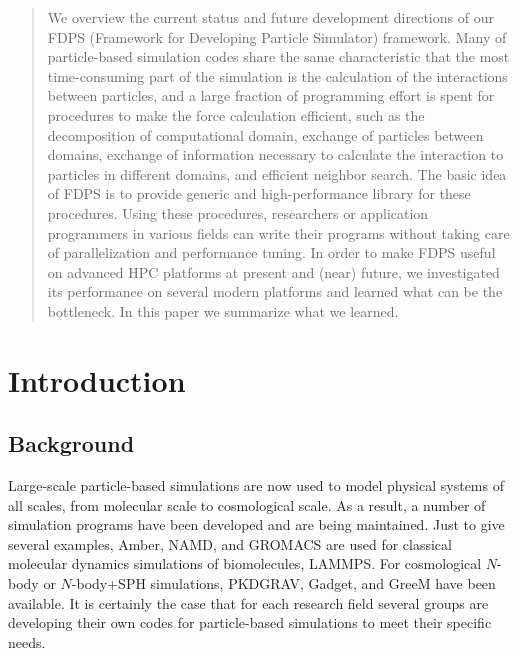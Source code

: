 \date{Received: date / Accepted: date}


\maketitle

\begin{abstract}
  We overview the current status and future development directions of
  our FDPS (Framework for Developing Particle Simulator)
  framework. Many of particle-based simulation codes share the same
  characteristic that the most time-consuming part of the 
  simulation is the calculation of the interactions between particles,
  and a large fraction of programming effort is spent for procedures to
  make the force calculation efficient, such as the decomposition of
  computational domain, exchange of particles between domains,
  exchange of information necessary to calculate the interaction to
  particles in different domains, and efficient neighbor search.  The
  basic idea of FDPS is to provide generic and high-performance
  library for these procedures. Using these procedures, researchers or
  application programmers in various fields can write their programs
  without taking care of parallelization and performance tuning. In
  order to make FDPS useful on advanced HPC platforms at present and
  (near) future, we investigated its performance on several modern
  platforms and learned what can be the bottleneck.  In this paper we
  summarize what we learned.  
\end{abstract}

\setcounter{tocdepth}{3}
\tableofcontents

\section{Introduction}
\label{sect:intro}

\subsection{Background}

Large-scale particle-based simulations are now used to model physical
systems of all scales, from molecular scale to cosmological scale. 
As a result, a number of simulation programs have been developed and
are being maintained. Just to give several examples, Amber\cite{Amber2012}, NAMD\cite{NAMD2005},
and GROMACS\cite{GROMACS2013} are used for classical molecular dynamics simulations of
biomolecules, LAMMPS\cite{LAMMPS1995}. For cosmological $N$-body or $N$-body+SPH
simulations, PKDGRAV\cite{PKDGRAV2017},  Gadget\cite{Springeletal2000}, and GreeM\cite{Ishiyamaetal2009b} have been
available. It is certainly the case that for each research field
several groups are developing their own  codes for particle-based
simulations to meet their specific needs. 

